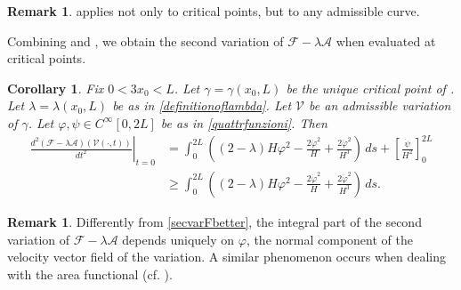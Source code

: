 \documentclass[11pt]{amsart}
\renewcommand{\geq}{\geqslant}
\newcommand{\A}{\mathcal A}
\newcommand{\F}{\mathcal F}
\newtheorem{corollary}[theorem]{Corollary}
\theoremstyle{definition}
\newtheorem{remark}[theorem]{Remark}
\theoremstyle{remark}
\numberwithin{equation}{section}
\begin{document}
\begin{remark}
 applies not only to critical points, but to any admissible curve.
\end{remark}
Combining  and , we obtain the second variation of $\F-\lambda\A$ when evaluated at critical points.
\begin{corollary}\label{corollstbofg}
Fix $0<3x_0<L$. Let $\gamma=\gamma(x_0,L)$ be the unique critical point of . Let $\lambda=\lambda(x_0,L)$ be as in \eqref{definitionoflambda}. Let $\mathcal V$ be an admissible variation of $\gamma$. Let $\varphi,\psi\in C^\infty[0,2L]$ be as in \eqref{quattrfunzioni}. Then 
\begin{equation} \label{secvarG}
	\begin{split}
		\left.\frac{d^2\left(\F-\lambda\A\right)(\mathcal V(\cdot,t))}{dt^2}\right|_{t=0}&=\int_0^{2L}\left((2-\lambda)H\varphi^2-\frac{2\dot\varphi^2}{H}+\frac{2\ddot\varphi^2}{H^3}\right)\,ds+\left[\frac{\dot\psi}{H^2}\right]_{0}^{2L}\\
		&\geq \int_0^{2L}\left((2-\lambda)H\varphi^2-\frac{2\dot\varphi^2}{H}+\frac{2\ddot\varphi^2}{H^3}\right)\,ds.
	\end{split}
\end{equation}
\end{corollary}
\begin{remark}
Differently from \eqref{secvarFbetter}, the integral part of the second variation of $\F-\lambda \A$ depends uniquely on $\varphi$, the normal component of the velocity vector field of the variation. A similar phenomenon occurs when dealing with the area functional (cf. \cite{MR731682}).
\end{remark}
\end{document}
